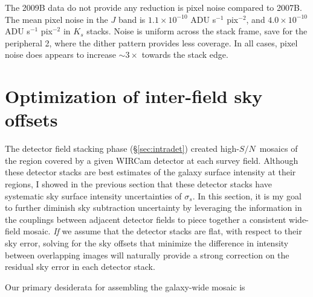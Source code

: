 \documentclass[iop]{emulateapj}
\newcommand{\sn}{\ensuremath{S/N}} %
\begin{document}

The 2009B data do not provide any reduction is pixel noise compared to 2007B. The mean pixel noise in the $J$ band is $1.1\times 10^{-10}$ ADU s$^{-1}$ pix$^{-2}$, and $4.0\times10^{-10}$ ADU s$^{-1}$ pix$^{-2}$ in $K_s$ stacks. Noise is uniform across the stack frame, save for the peripheral 2\arcmin, where the dither pattern provides less coverage. In all cases, pixel noise does appears to increase  $\sim 3\times$ towards the stack edge.

\section{Optimization of inter-field sky offsets}
\label{sec:interdet}

The detector field stacking phase (\S \ref{sec:intradet}) created high-\sn\ mosaics of the region covered by a given WIRCam detector at each survey field. Although these detector stacks are best estimates of the galaxy surface intensity at their regions, I showed in the previous section that these detector stacks have systematic sky surface intensity uncertainties of $\sigma_s$. In this section, it is my goal to further diminish sky subtraction uncertainty by leveraging the information in the couplings between adjacent detector fields to piece together a consistent wide-field mosaic. \emph{If} we assume that the detector stacks are flat, with respect to their sky error, solving for the sky offsets that minimize the difference in intensity between overlapping images will naturally provide a strong correction on the residual sky error in each detector stack.

Our primary desiderata for assembling the galaxy-wide mosaic is
\end{document}
